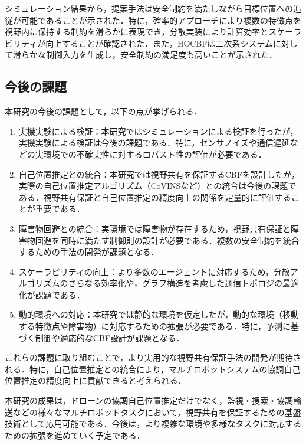 シミュレーション結果から，提案手法は安全制約を満たしながら目標位置への追従が可能であることが示された．特に，確率的アプローチにより複数の特徴点を視野内に保持する制約を滑らかに表現でき，分散実装により計算効率とスケーラビリティが向上することが確認された．また，HOCBFは二次系システムに対して滑らかな制御入力を生成し，安全制約の満足度も高いことが示された．

\subsection{今後の課題}

本研究の今後の課題として，以下の点が挙げられる．

\begin{enumerate}
    \item 実機実験による検証：本研究ではシミュレーションによる検証を行ったが，実機実験による検証は今後の課題である．特に，センサノイズや通信遅延などの実環境での不確実性に対するロバスト性の評価が必要である．
    
    \item 自己位置推定との統合：本研究では視野共有を保証するCBFを設計したが，実際の自己位置推定アルゴリズム（CoVINSなど）との統合は今後の課題である．視野共有保証と自己位置推定の精度向上の関係を定量的に評価することが重要である．
    
    \item 障害物回避との統合：実環境では障害物が存在するため，視野共有保証と障害物回避を同時に満たす制御則の設計が必要である．複数の安全制約を統合するための手法の開発が課題となる．
    
    \item スケーラビリティの向上：より多数のエージェントに対応するため，分散アルゴリズムのさらなる効率化や，グラフ構造を考慮した通信トポロジの最適化が課題である．
    
    \item 動的環境への対応：本研究では静的な環境を仮定したが，動的な環境（移動する特徴点や障害物）に対応するための拡張が必要である．特に，予測に基づく制御や適応的なCBF設計が課題となる．
\end{enumerate}

これらの課題に取り組むことで，より実用的な視野共有保証手法の開発が期待される．特に，自己位置推定との統合により，マルチロボットシステムの協調自己位置推定の精度向上に貢献できると考えられる．

本研究の成果は，ドローンの協調自己位置推定だけでなく，監視・捜索・協調輸送などの様々なマルチロボットタスクにおいて，視野共有を保証するための基盤技術として応用可能である．今後は，より複雑な環境や多様なタスクに対応するための拡張を進めていく予定である．
